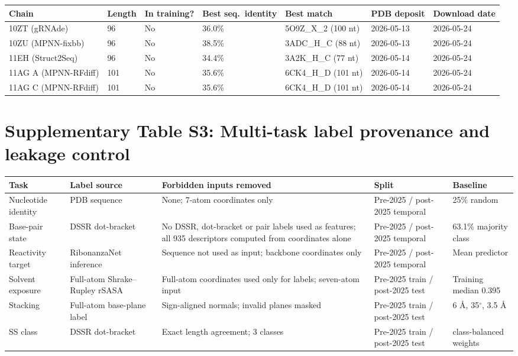 \documentclass[pdflatex,sn-nature]{sn-jnl}
\begin{document}
\begingroup\footnotesize
\begin{adjustbox}{width=\textwidth}
\begin{tabular}{p{}p{}p{}p{}p{}p{}p{}}
\toprule
Chain & Length & In training? & Best seq.\ identity & Best match & PDB deposit & Download date \\
\midrule
10ZT (gRNAde) & 96 & No & 36.0\% & 5O9Z\_X\_2 (100 nt) & 2026-05-13 & 2026-05-24 \\
10ZU (MPNN-fixbb) & 96 & No & 38.5\% & 3ADC\_H\_C (88 nt) & 2026-05-13 & 2026-05-24 \\
11EH (Struct2Seq) & 96 & No & 34.4\% & 3A2K\_H\_C (77 nt) & 2026-05-14 & 2026-05-24 \\
11AG A (MPNN-RFdiff) & 101 & No & 35.6\% & 6CK4\_H\_D (101 nt) & 2026-05-14 & 2026-05-24 \\
11AG C (MPNN-RFdiff) & 101 & No & 35.6\% & 6CK4\_H\_D (101 nt) & 2026-05-14 & 2026-05-24 \\
\bottomrule
\end{tabular}
\end{adjustbox}
\endgroup

\clearpage
\section*{Supplementary Table S3: Multi-task label provenance and leakage control}

\begingroup\footnotesize
\begin{adjustbox}{width=\textwidth}
\begin{tabular}{p{}p{}p{}p{}p{}}
\toprule
Task & Label source & Forbidden inputs removed & Split & Baseline \\
\midrule
Nucleotide identity & PDB sequence & None; 7-atom coordinates only & Pre-2025 / post-2025 temporal & 25\% random \\
Base-pair state & DSSR dot-bracket & No DSSR, dot-bracket or pair labels used as features; all 935 descriptors computed from coordinates alone & Pre-2025 / post-2025 temporal & 63.1\% majority class \\
Reactivity target & RibonanzaNet inference & Sequence not used as input; backbone coordinates only & Pre-2025 / post-2025 temporal & Mean predictor \\
Solvent exposure & Full-atom Shrake--Rupley rSASA & Full-atom coordinates used only for labels; seven-atom input & Pre-2025 train / post-2025 test & Training median 0.395 \\
Stacking & Full-atom base-plane label & Sign-aligned normals; invalid planes masked & Pre-2025 train / post-2025 test & 6 \AA{}, 35$^\circ$, 3.5 \AA{} \\
SS class & DSSR dot-bracket & Exact length agreement; 3 classes & Pre-2025 train / post-2025 test & class-balanced weights \\
\bottomrule
\end{tabular}
\end{adjustbox}
\endgroup
\end{document}
